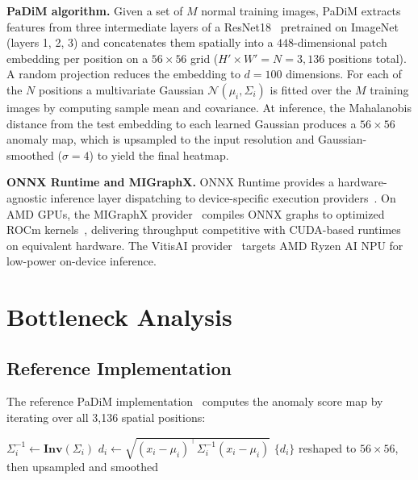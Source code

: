 \documentclass[blind]{gtac}
\begin{document}
\textbf{PaDiM algorithm.}
Given a set of $M$ normal training images, PaDiM extracts features from three
intermediate layers of a ResNet18~\cite{he2016deep} pretrained on
ImageNet~\cite{deng2009imagenet} (layers 1, 2, 3) and concatenates them
spatially into a $448$-dimensional patch embedding per position on a
$56\!\times\!56$ grid ($H'\!\times\!W'\!=\!N\!=\!3{,}136$ positions total).  A
random projection reduces the embedding to $d\!=\!100$ dimensions.  For each of
the $N$ positions a multivariate Gaussian $\mathcal{N}(\mu_i, \Sigma_i)$
is fitted over the $M$ training images by computing sample mean and covariance.  At
inference, the Mahalanobis distance from the test embedding to each learned
Gaussian produces a $56\!\times\!56$ anomaly map, which is upsampled to the
input resolution and Gaussian-smoothed ($\sigma\!=\!4$) to yield the final heatmap.

\textbf{ONNX Runtime and MIGraphX.}
ONNX Runtime provides a hardware-agnostic inference layer dispatching to
device-specific execution providers~\cite{onnxruntime}.  On AMD GPUs, the
MIGraphX provider~\cite{migraphx} compiles ONNX graphs to optimized ROCm
kernels~\cite{rocm}, delivering throughput competitive with CUDA-based runtimes
on equivalent hardware.  The VitisAI provider~\cite{vitisai} targets AMD Ryzen
AI NPU for low-power on-device inference.

\section{Bottleneck Analysis}
\label{sec:analysis}

\subsection{Reference Implementation}

The reference PaDiM implementation~\cite{padim_repo} computes the anomaly score
map by iterating over all 3{,}136 spatial positions:

\begin{algorithm}[H]
\footnotesize
\caption{Mahalanobis computation in the reference PaDiM implementation}
\label{alg:baseline}
\begin{algorithmic}[1]
  \State $\Sigma_i^{-1} \leftarrow \mathbf{Inv}(\Sigma_i)$
  \State $d_i \leftarrow \sqrt{(x_i - \mu_i)^\top \Sigma_i^{-1} (x_i - \mu_i)}$
\EndFor
\State \Return $\{d_i\}$ reshaped to $56\!\times\!56$, then upsampled and smoothed
\end{algorithmic}
\end{algorithm}
\end{document}
